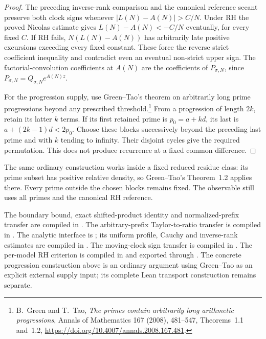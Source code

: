\documentclass[11pt]{article}
\theoremstyle{definition}
\begin{document}
\begin{proof}
The preceding inverse-rank comparison and the canonical reference secant
preserve both clock signs whenever $|L(N)-A(N)|>C/N$.
Under RH the proved Nicolas estimate gives
$L(N)-A(N)<-C/N$ eventually, for every fixed $C$.
If RH fails, $N(L(N)-A(N))$ has arbitrarily late positive excursions
exceeding every fixed constant. These force the reverse strict coefficient
inequality and contradict even an eventual non-strict upper sign.
The factorial-convolution coefficients at $A(N)$ are the coefficients of
$P_{\sigma,N}$, since $P_{\sigma,N}=Q_{\sigma,N}e^{A(N)z}$.

For the progression supply, use Green--Tao's theorem on arbitrarily long
prime progressions beyond any prescribed threshold.\footnote{B.~Green and
T.~Tao, \emph{The primes contain arbitrarily long arithmetic progressions},
Annals of Mathematics 167 (2008), 481--547, Theorems~1.1 and~1.2,
\url{https://doi.org/10.4007/annals.2008.167.481}.}
From a progression of length $2k$, retain its latter $k$ terms.
If its first retained prime is $p_0=a+kd$, its last is
$a+(2k-1)d<2p_0$. Choose these blocks successively beyond the preceding
last prime and with $k$ tending to infinity. Their disjoint cycles give
the required permutation. This does not produce recurrence at a fixed
common difference.
\end{proof}

The same ordinary construction works inside a fixed reduced residue class:
its prime subset has positive relative density, so Green--Tao's
Theorem~1.2 applies there. Every prime outside the chosen blocks remains
fixed. The observable still uses all primes and the canonical RH reference.

\begin{flushleft}
The boundary bound, exact shifted-product identity and normalized-prefix
transfer are compiled in
.
The arbitrary-prefix Taylor-to-ratio transfer is compiled in
.
The analytic interface is
; its uniform profile, Cauchy and
inverse-rank estimates are compiled in
.
The moving-clock sign transfer is compiled in
.
The per-model RH criterion is compiled in
 and exported through
.
The concrete progression construction above is an ordinary argument using
Green--Tao as an explicit external supply input; its complete Lean transport
construction remains separate.
\end{flushleft}
\end{document}
